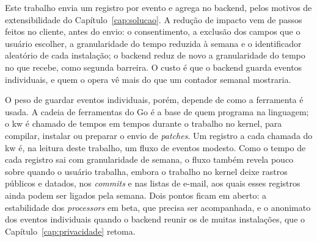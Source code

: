 Este trabalho envia um registro por evento e
agrega no backend, pelos motivos de extensibilidade do
Capítulo~\ref{cap:solucao}. A redução de impacto vem de passos feitos no
cliente, antes do envio: o consentimento, a exclusão dos campos que o usuário
escolher, a granularidade do tempo reduzida à semana e o identificador
aleatório de cada instalação; o backend reduz de novo a granularidade do
tempo no que recebe, como segunda barreira. O custo é que o backend guarda eventos individuais, e quem o
opera vê mais do que um contador semanal mostraria.

O peso de guardar eventos individuais, porém, depende de como a ferramenta é
usada. A cadeia de ferramentas do Go é a base de quem programa na linguagem; o
kw é chamado de tempos em tempos durante o trabalho no kernel, para compilar,
instalar ou preparar o envio de \textit{patches}. Um registro a cada chamada
do kw é, na leitura deste trabalho, um fluxo de eventos modesto. Como o tempo
de cada registro sai com granularidade de semana, o fluxo também revela pouco sobre
quando o usuário trabalha, embora o trabalho no kernel deixe rastros públicos e
datados, nos \textit{commits} e nas listas de e-mail, aos quais esses
registros ainda podem ser ligados pela semana. Dois pontos ficam em aberto: a
estabilidade dos \textit{processors} em beta, que precisa ser acompanhada, e o
anonimato dos eventos individuais quando o backend reunir os de muitas
instalações, que o Capítulo~\ref{cap:privacidade} retoma.